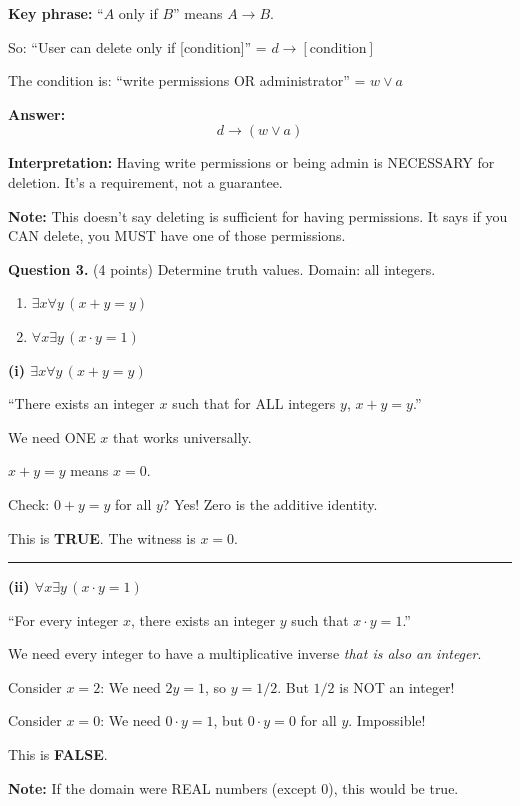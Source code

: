 \documentclass[11pt,a4paper]{article}
\begin{document}
\begin{solnbox}
\textbf{Key phrase:} ``$A$ only if $B$'' means $A \to B$.

So: ``User can delete only if [condition]'' = $d \to [\text{condition}]$

The condition is: ``write permissions OR administrator'' = $w \lor a$

\textbf{Answer:}
$$\boxed{d \to (w \lor a)}$$

\textbf{Interpretation:} Having write permissions or being admin is NECESSARY for deletion. It's a requirement, not a guarantee.

\textbf{Note:} This doesn't say deleting is sufficient for having permissions. It says if you CAN delete, you MUST have one of those permissions.
\end{solnbox}

\vspace{15pt}

\textbf{Question 3.} (4 points) Determine truth values. Domain: all integers.

\begin{enumerate}[label=(\roman*)]
    \item $\exists x \forall y\, (x + y = y)$
    \item $\forall x \exists y\, (x \cdot y = 1)$
\end{enumerate}

\begin{solnbox}
\textbf{(i) $\exists x \forall y\, (x + y = y)$}

``There exists an integer $x$ such that for ALL integers $y$, $x + y = y$.''

We need ONE $x$ that works universally.

$x + y = y$ means $x = 0$.

Check: $0 + y = y$ for all $y$? Yes! Zero is the additive identity.

This is \textbf{TRUE}. The witness is $x = 0$.

\rule{\linewidth}{0.3pt}

\textbf{(ii) $\forall x \exists y\, (x \cdot y = 1)$}

``For every integer $x$, there exists an integer $y$ such that $x \cdot y = 1$.''

We need every integer to have a multiplicative inverse \textit{that is also an integer}.

Consider $x = 2$: We need $2y = 1$, so $y = 1/2$. But $1/2$ is NOT an integer!

Consider $x = 0$: We need $0 \cdot y = 1$, but $0 \cdot y = 0$ for all $y$. Impossible!

This is \textbf{FALSE}.

\textbf{Note:} If the domain were REAL numbers (except 0), this would be true.
\end{solnbox}
\end{document}
